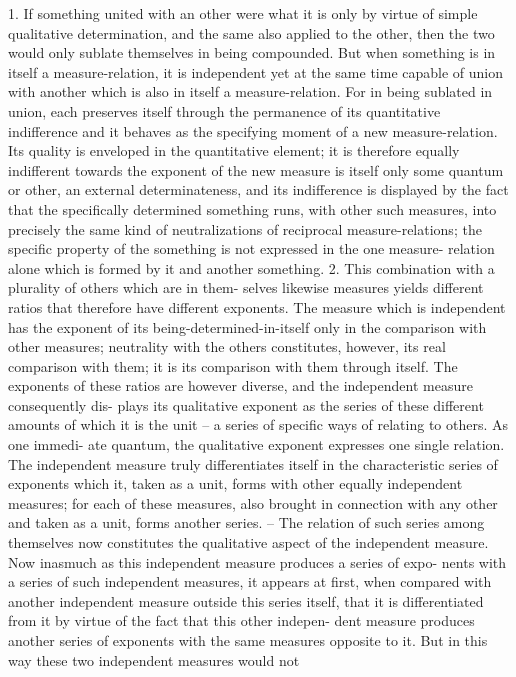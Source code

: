 1. If something united with an other were what it is only by virtue of
simple qualitative determination, and the same also applied to the other,
then the two would only sublate themselves in being compounded. But
when something is in itself a measure-relation, it is independent yet at
the same time capable of union with another which is also in itself a
measure-relation. For in being sublated in union, each preserves itself
through the permanence of its quantitative indifference and it behaves as
the specifying moment of a new measure-relation. Its quality is enveloped
in the quantitative element; it is therefore equally indifferent towards the
exponent of the new measure is itself only some quantum or other, an
external determinateness, and its indifference is displayed by the fact that
the specifically determined something runs, with other such measures, into
precisely the same kind of neutralizations of reciprocal measure-relations;
the specific property of the something is not expressed in the one measure-
relation alone which is formed by it and another something.
2. This combination with a plurality of others which are in them-
selves likewise measures yields different ratios that therefore have different
exponents. The measure which is independent has the exponent of its
being-determined-in-itself only in the comparison with other measures;
neutrality with the others constitutes, however, its real comparison with
them; it is its comparison with them through itself. The exponents of these
ratios are however diverse, and the independent measure consequently dis-
plays its qualitative exponent as the series of these different amounts of which
it is the unit – a series of specific ways of relating to others. As one immedi-
ate quantum, the qualitative exponent expresses one single relation. The
independent measure truly differentiates itself in the characteristic series of
exponents which it, taken as a unit, forms with other equally independent
measures; for each of these measures, also brought in connection with
any other and taken as a unit, forms another series. – The relation of
such series among themselves now constitutes the qualitative aspect of the
independent measure.
Now inasmuch as this independent measure produces a series of expo-
nents with a series of such independent measures, it appears at first, when
compared with another independent measure outside this series itself, that
it is differentiated from it by virtue of the fact that this other indepen-
dent measure produces another series of exponents with the same measures
opposite to it. But in this way these two independent measures would not
